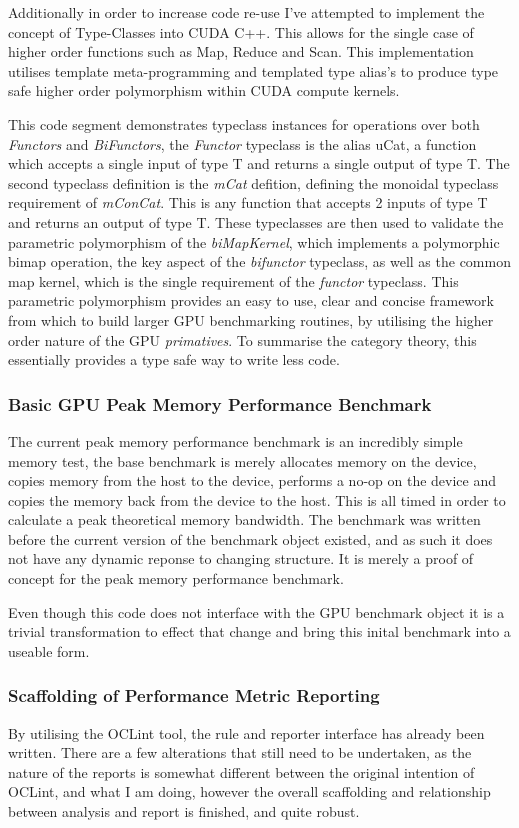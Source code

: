 Additionally in order to increase code re-use I've attempted to implement the concept of Type-Classes into CUDA C++. This allows for the single case of higher order functions such as Map, Reduce and Scan. This implementation utilises template meta-programming and templated type alias's to produce type safe higher order polymorphism within CUDA compute kernels.

This code segment demonstrates typeclass instances for operations over both \textit{Functors} and \textit{BiFunctors}, the \textit{Functor} typeclass is the alias uCat, a function which accepts a single input of type T and returns a single output of type T. The second typeclass definition is the \textit{mCat} defition, defining the monoidal typeclass requirement of \textit{mConCat}. This is any function that accepts 2 inputs of type T and returns an output of type T. These typeclasses are then used to validate the parametric polymorphism of the \textit{biMapKernel}, which implements a polymorphic bimap operation, the key aspect of the \textit{bifunctor} typeclass, as well as the common map kernel, which is the single requirement of the \textit{functor} typeclass. This parametric polymorphism provides an easy to use, clear and concise framework from which to build larger GPU benchmarking routines, by utilising the higher order nature of the GPU \textit{primatives}. To summarise the category theory, this essentially provides a type safe way to write less code.

\subsubsection{Basic GPU Peak Memory Performance Benchmark}
The current peak memory performance benchmark is an incredibly simple memory test, the base benchmark is merely allocates memory on the device, copies memory from the host to the device, performs a no-op on the device and copies the memory back from the device to the host. This is all timed in order to calculate a peak theoretical memory bandwidth. The benchmark was written before the current version of the benchmark object existed, and as such it does not have any dynamic reponse to changing structure. It is merely a proof of concept for the peak memory performance benchmark.

Even though this code does not interface with the GPU benchmark object it is a trivial transformation to effect that change and bring this inital benchmark into a useable form.

\subsubsection{Scaffolding of Performance Metric Reporting}
By utilising the OCLint tool, the rule and reporter interface has already been written. There are a few alterations that still need to be undertaken, as the nature of the reports is somewhat different between the original intention of OCLint, and what I am doing, however the overall scaffolding and relationship between analysis and report is finished, and quite robust.

